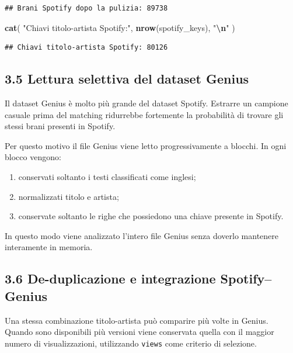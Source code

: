 \documentclass[
]{article}
\newenvironment{Shaded}{\begin{snugshade}}{\end{snugshade}}
\newcommand{\FunctionTok}[1]{\textcolor[rgb]{0.13,0.29,0.53}{\textbf{#1}}}
\newcommand{\NormalTok}[1]{#1}
\newcommand{\SpecialCharTok}[1]{\textcolor[rgb]{0.81,0.36,0.00}{\textbf{#1}}}
\newcommand{\StringTok}[1]{\textcolor[rgb]{0.31,0.60,0.02}{#1}}
\providecommand{\tightlist}{%
  \setlength{\itemsep}{0pt}\setlength{\parskip}{0pt}}
\begin{document}
\begin{verbatim}
## Brani Spotify dopo la pulizia: 89738
\end{verbatim}

\begin{Shaded}
\begin{Highlighting}[]
\FunctionTok{cat}\NormalTok{(}
  \StringTok{"Chiavi titolo{-}artista Spotify:"}\NormalTok{,}
  \FunctionTok{nrow}\NormalTok{(spotify\_keys),}
  \StringTok{"}\SpecialCharTok{\textbackslash{}n}\StringTok{"}
\NormalTok{)}
\end{Highlighting}
\end{Shaded}

\begin{verbatim}
## Chiavi titolo-artista Spotify: 80126
\end{verbatim}

\subsection{3.5 Lettura selettiva del dataset
Genius}\label{lettura-selettiva-del-dataset-genius}

Il dataset Genius è molto più grande del dataset Spotify. Estrarre un
campione casuale prima del matching ridurrebbe fortemente la probabilità
di trovare gli stessi brani presenti in Spotify.

Per questo motivo il file Genius viene letto progressivamente a blocchi.
In ogni blocco vengono:

\begin{enumerate}
\def\labelenumi{\arabic{enumi}.}
\tightlist
\item
  conservati soltanto i testi classificati come inglesi;
\item
  normalizzati titolo e artista;
\item
  conservate soltanto le righe che possiedono una chiave presente in
  Spotify.
\end{enumerate}

In questo modo viene analizzato l'intero file Genius senza doverlo
mantenere interamente in memoria.

\subsection{3.6 De-duplicazione e integrazione
Spotify--Genius}\label{de-duplicazione-e-integrazione-spotifygenius}

Una stessa combinazione titolo-artista può comparire più volte in
Genius. Quando sono disponibili più versioni viene conservata quella con
il maggior numero di visualizzazioni, utilizzando \texttt{views} come
criterio di selezione.
\end{document}
